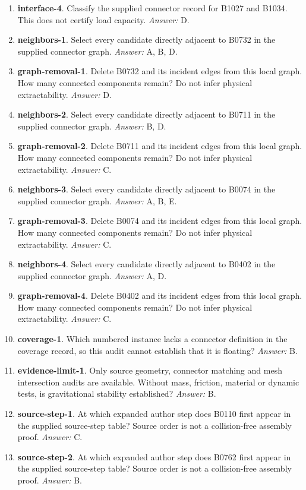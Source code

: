 \begin{enumerate}
\item \textbf{interface-4}. Classify the supplied connector record for B1027 and B1034. This does not certify load capacity. \textit{Answer:} D.
\item \textbf{neighbors-1}. Select every candidate directly adjacent to B0732 in the supplied connector graph. \textit{Answer:} A, B, D.
\item \textbf{graph-removal-1}. Delete B0732 and its incident edges from this local graph. How many connected components remain? Do not infer physical extractability. \textit{Answer:} D.
\item \textbf{neighbors-2}. Select every candidate directly adjacent to B0711 in the supplied connector graph. \textit{Answer:} B, D.
\item \textbf{graph-removal-2}. Delete B0711 and its incident edges from this local graph. How many connected components remain? Do not infer physical extractability. \textit{Answer:} C.
\item \textbf{neighbors-3}. Select every candidate directly adjacent to B0074 in the supplied connector graph. \textit{Answer:} A, B, E.
\item \textbf{graph-removal-3}. Delete B0074 and its incident edges from this local graph. How many connected components remain? Do not infer physical extractability. \textit{Answer:} C.
\item \textbf{neighbors-4}. Select every candidate directly adjacent to B0402 in the supplied connector graph. \textit{Answer:} A, D.
\item \textbf{graph-removal-4}. Delete B0402 and its incident edges from this local graph. How many connected components remain? Do not infer physical extractability. \textit{Answer:} C.
\item \textbf{coverage-1}. Which numbered instance lacks a connector definition in the coverage record, so this audit cannot establish that it is floating? \textit{Answer:} B.
\item \textbf{evidence-limit-1}. Only source geometry, connector matching and mesh intersection audits are available. Without mass, friction, material or dynamic tests, is gravitational stability established? \textit{Answer:} B.
\item \textbf{source-step-1}. At which expanded author step does B0110 first appear in the supplied source-step table? Source order is not a collision-free assembly proof. \textit{Answer:} C.
\item \textbf{source-step-2}. At which expanded author step does B0762 first appear in the supplied source-step table? Source order is not a collision-free assembly proof. \textit{Answer:} B.

\end{enumerate}
